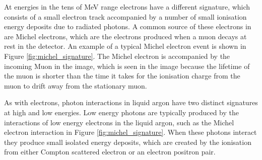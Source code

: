 At energies in the tens of MeV range electrons have a different signature, 
which consists of a small electron track accompanied by a number of small 
ionisation energy deposits due to radiated photons. A common source of these
electrons in \protodune{} are Michel electrons, which are the electrons produced
when a muon decays at rest in the detector. An example of a typical Michel
electron event is shown in Figure \ref{fig:michel_signature}. The Michel 
electron is accompanied by the incoming Muon in the image, which is seen in the
image because the lifetime of the muon is shorter than the time it takes for 
the ionisation charge from the muon to drift away from the stationary muon.

As with electrons, photon interactions in liquid argon have two distinct
signatures at high and low energies. Low energy photons are typically produced
by the interactions of low energy electrons in the liquid argon, such as the
Michel electron interaction in Figure \ref{fig:michel_signature}. When these 
photons interact they produce small isolated energy deposits, which are 
created by the ionisation from either Compton scattered electron or an electron 
positron pair.

